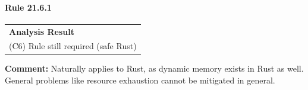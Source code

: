 \paragraph{Rule 21.6.1}
\begin{longtable}{p{13cm}}
\textbf{Analysis Result} \\
(C6) Rule still required (safe Rust) \\
\end{longtable}
\textbf{Comment:} Naturally applies to Rust, as dynamic memory exists in Rust as well. General problems like resource exhaustion cannot be mitigated in general. \\


